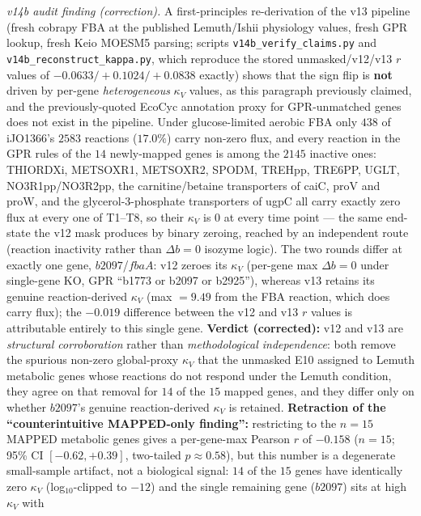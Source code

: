 \documentclass[11pt,a4paper]{article}
\theoremstyle{plain}
\theoremstyle{definition}
\theoremstyle{remark}
\begin{document}
\medskip
\emph{v14b audit finding (correction).} A first-principles re-derivation
of the v13 pipeline (fresh cobrapy FBA at the published Lemuth/Ishii
physiology values, fresh GPR lookup, fresh Keio MOESM5 parsing; scripts
\texttt{v14b\_verify\_claims.py} and
\texttt{v14b\_reconstruct\_kappa.py}, which reproduce the stored
unmasked/v12/v13 $r$ values of $-0.0633/+0.1024/+0.0838$ exactly) shows
that the sign flip is \textbf{not} driven by per-gene
\emph{heterogeneous} $\kappa_V$ values, as this paragraph previously
claimed, and the previously-quoted EcoCyc annotation proxy for
GPR-unmatched genes does not exist in the pipeline. Under
glucose-limited aerobic FBA only $438$ of iJO1366's $2583$ reactions
($17.0\%$) carry non-zero flux, and every reaction in the GPR rules of
the $14$ newly-mapped genes is among the $2145$ inactive ones:
THIORDXi, METSOXR1, METSOXR2, SPODM, TREHpp, TRE6PP, UGLT,
NO3R1pp/NO3R2pp, the carnitine/betaine transporters of caiC, proV and
proW, and the glycerol-3-phosphate transporters of ugpC all carry
exactly zero flux at every one of T1--T8, so their $\kappa_V$ is $0$ at
every time point --- the same end-state the v12 mask produces by binary
zeroing, reached by an independent route (reaction inactivity rather
than $\Delta b = 0$ isozyme logic). The two rounds differ at exactly
one gene, $b2097$/$\mathit{fbaA}$: v12 zeroes its $\kappa_V$ (per-gene
max $\Delta b = 0$ under single-gene KO, GPR ``b1773 or b2097 or
b2925''), whereas v13 retains its genuine reaction-derived $\kappa_V$
(max $= 9.49$ from the FBA reaction, which does carry flux); the
$-0.019$ difference between the v12 and v13 $r$ values is attributable
entirely to this single gene. \textbf{Verdict (corrected):} v12 and v13
are \emph{structural corroboration} rather than \emph{methodological
independence}: both remove the spurious non-zero global-proxy
$\kappa_V$ that the unmasked E10 assigned to Lemuth metabolic genes
whose reactions do not respond under the Lemuth condition, they agree
on that removal for $14$ of the $15$ mapped genes, and they differ only
on whether $b2097$'s genuine reaction-derived $\kappa_V$ is retained.
\textbf{Retraction of the ``counterintuitive MAPPED-only finding'':}
restricting to the $n=15$ MAPPED metabolic genes gives a per-gene-max
Pearson $r$ of $-0.158$ ($n=15$; 95\% CI $[-0.62, +0.39]$, two-tailed
$p \approx 0.58$), but this number is a degenerate small-sample
artifact, not a biological signal: $14$ of the $15$ genes have
identically zero $\kappa_V$ (log$_{10}$-clipped to $-12$) and the
single remaining gene ($b2097$) sits at high $\kappa_V$ with
\end{document}
